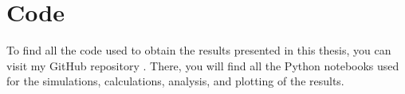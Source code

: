 \newpage
\renewcommand{\theequation}{\Alph{section}\arabic{equation}}
\setcounter{equation}{2}
\appendix



\chapter{Code}\label{ap.C}

To find all the code used to obtain the results presented in this thesis, you can visit my GitHub repository \parencite{github}.
There, you will find all the Python notebooks used for the simulations, calculations, analysis, and plotting of the results.


%
%
